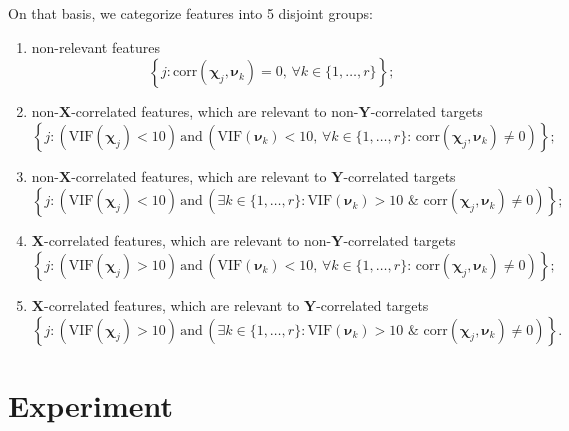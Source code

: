 \documentclass[12pt,twoside]{article}
\newcommand{\bY}{\mathbf{Y}}
\newcommand{\bX}{\mathbf{X}}
\newcommand{\bchi}{\boldsymbol{\chi}}
\newcommand{\bnu}{\boldsymbol{\nu}}
\begin{document}
On that basis, we categorize features into 5 disjoint groups:
\begin{enumerate}
	\item non-relevant features
	\[
		\left\{j: \text{corr}(\bchi_j, \bnu_k) = 0, \, \forall k \in \{1, \dots, r\}\right\};
	\]
	\item non-$\bX$-correlated features, which are relevant to non-$\bY$-correlated targets
	\[
		\left\{j: \left(\text{VIF}(\bchi_j) < 10\right) \, \text{and} \, \left(\text{VIF}(\bnu_k) < 10 , \, \forall k \in \{1, \dots, r\}: \,  \text{corr}(\bchi_j, \bnu_k) \neq 0 \right)\right\};
	\]
	\item non-$\bX$-correlated features, which are relevant to $\bY$-correlated targets
	\[
		\left\{j: \left(\text{VIF}(\bchi_j) < 10\right) \, \text{and} \, \left( \exists k \in \{1, \dots, r\}: \text{VIF}(\bnu_k) > 10 \,\, \& \,\, \text{corr}(\bchi_j, \bnu_k) \neq 0 \right)\right\};
	\]
	\item $\bX$-correlated features, which are relevant to non-$\bY$-correlated targets
	\[
		\left\{j: \left(\text{VIF}(\bchi_j) > 10\right) \, \text{and} \, \left(\text{VIF}(\bnu_k) < 10 , \, \forall k \in \{1, \dots, r\}: \,  \text{corr}(\bchi_j, \bnu_k) \neq 0 \right)\right\};
	\]
	\item $\bX$-correlated features, which are relevant to $\bY$-correlated targets
	\[
		\left\{j: \left(\text{VIF}(\bchi_j) > 10\right) \, \text{and} \, \left( \exists k \in \{1, \dots, r\}: \text{VIF}(\bnu_k) > 10 \,\, \& \,\, \text{corr}(\bchi_j, \bnu_k) \neq 0 \right)\right\}.
	\]
\end{enumerate}


\section{Experiment}
\end{document}
